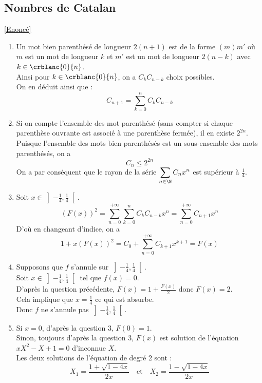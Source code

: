 \documentclass[8pt]{book}
\begin{document}
	\subsection{Nombres de Catalan}
	\label{Nombres de Catalan corrigé}
	\textcolor{blue}{\hyperref[Nombres de Catalan]{[Enoncé]}}\\
	\begin{enumerate}[leftmargin=*]
		\item Un mot bien parenthésé de longueur $2(n+1)$ est de la forme $(m)m'$ où $m$ est un mot de longueur $k$ et $m'$ est un mot de longueur $2(n-k)$ avec $k\in\crblanc{0}{n}$.\\
		Ainsi pour $k\in\crblanc{0}{n}$, on a $C_kC_{n-k}$ choix possibles.\\
		On en déduit ainsi que : \[C_{n+1}=\sum_{k=0}^{n}C_kC_{n-k}\]
		\item Si on compte l'ensemble des mot parenthésé (sans compter si chaque parenthèse ouvrante est associé à une parenthèse fermée), il en existe $2^{2n}$.\\
		Puisque l'ensemble des mots bien parenthésés est un sous-ensemble des mots parenthésés, on a \[C_n\leq 2^{2n}\]
		On a par conséquent que le rayon de la série $\displaystyle \sum_{n\in\N}C_nx^n$ est supérieur à $\displaystyle \frac{1}{4}$.\\
		\item Soit $x\in\left]-\frac{1}{4},\frac{1}{4}\right[$.\\
		\[(F(x))^2=\sum_{n=0}^{+\infty}\sum_{k=0}^{n}C_kC_{n-k}x^n=\sum_{n=0}^{+\infty}C_{n+1}x^n\]
		D'où en changeant d'indice, on a 
		\[1+x(F(x))^2=C_0+\sum_{n=0}^{+\infty}C_{k+1}x^{k+1}=F(x)\]
		\item Supposons que $f$ s'annule sur $\left]-\frac{1}{4},\frac{1}{4}\right[$.\\
		Soit $x\in\left]-\frac{1}{4},\frac{1}{4}\right[$ tel que $f(x)=0$.\\
		D'après la question précédente, $F(x)=1+\frac{F(x)}{2}$ donc $F(x)=2$.\\
		Cela implique que $x=\frac{1}{4}$ ce qui est absurbe.\\
		Donc $f$ ne s'annule pas $\left]-\frac{1}{4},\frac{1}{4}\right[$.
		\item Si $x=0$, d'après la question 3, $F(0)=1$.\\
		Sinon, toujours d'après la question 3, $F(x)$ est solution de l'équation $xX^2-X+1=0$ d'inconnue $X$.\\
		Les deux solutions de l'équation de degré 2 sont : 
		\[X_1=\frac{1+\sqrt{1-4x}}{2x} \quad \text{et}\quad X_2=\frac{1-\sqrt{1-4x}}{2x}\]

\end{enumerate}
\end{document}
